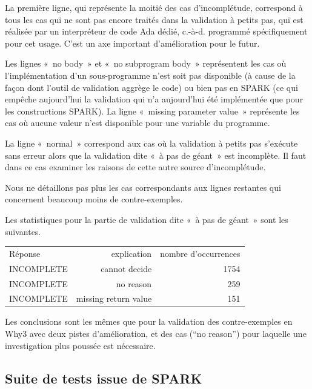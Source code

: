 \documentclass[a4paper,11pt]{article}
\begin{document}
La première ligne, qui représente la moitié des cas d'incomplétude, correspond à
tous les cas qui ne sont pas encore traités dans la validation à petits pas, qui
est réalisée par un interpréteur de code Ada dédié, c.-à-d. programmé
spécifiquement pour cet usage. C'est un axe important d'amélioration pour le
futur.

Les lignes «~no body~» et «~no subprogram body~» représentent les cas où
l'implémentation d'un sous-programme n'est soit pas disponible (à cause de la
façon dont l'outil de validation aggrège le code) ou bien pas en SPARK (ce qui
empêche aujourd'hui la validation qui n'a aujourd'hui été implémentée que
pour les constructions SPARK). La ligne «~missing
parameter value~» représente les cas où aucune valeur n'est disponible pour une
variable du programme.

La ligne «~normal~» correspond aux cas où la validation à petits pas s'exécute
sans erreur alors que la validation dite «~à pas de géant~» est incomplète. Il faut
dans ce cas examiner les raisons de cette autre source d'incomplétude.

Nous ne détaillons pas plus les cas correspondants aux lignes restantes qui
concernent beaucoup moins de contre-exemples.

Les statistiques pour la
partie de validation dite «~à pas de géant~» sont les suivantes.
\begin{center}
  \begin{tabular}{|l|r|r|}
    \hline
  \rowcolor{gray!50} Réponse
  & \multicolumn{1}{p{0.65\textwidth}|}{explication}
  & \multicolumn{1}{p{0.13\textwidth}|}{nombre d'occurrences}
    \\
INCOMPLETE & cannot decide	   & 1754 \\
INCOMPLETE & no reason             &  259 \\
    INCOMPLETE & missing return value  &  151 \\
    \hline
  \end{tabular}
\end{center}
Les conclusions sont les mêmes que pour la validation des contre-exemples en
Why3 avec deux pistes d'amélioration, et des cas (``no reason'') pour laquelle
une investigation plus poussée est nécessaire.

\subsection{Suite de tests issue de SPARK}
\end{document}
